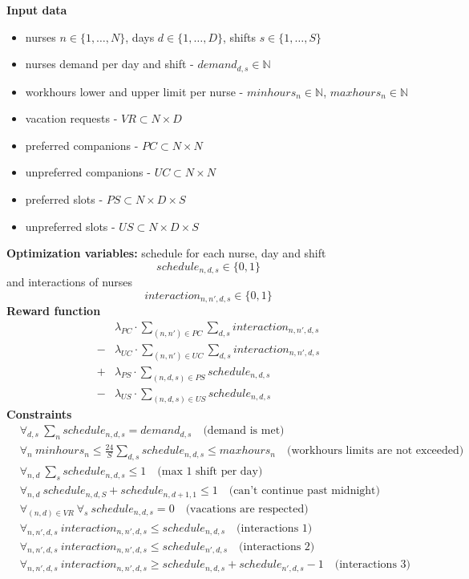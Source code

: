 \documentclass{article}
\newcommand{\N}{\mathbb{N}}
\begin{document}
\noindent \textbf{Input data}
\begin{itemize}
    \item nurses $n\in \{1, \dots, N\}$, days $d\in \{1, \dots, D\}$, shifts $s\in \{1, \dots, S\}$
    \item nurses demand per day and shift - $demand_{d,s} \in \N$
    \item workhours lower and upper limit per nurse - $minhours_n \in \N$, $maxhours_n \in \N$
    \item vacation requests - $VR \subset N \times D$
    \item preferred companions - $PC \subset N \times N$
    \item unpreferred companions - $UC \subset N \times N$
    \item preferred slots - $PS \subset N \times D \times S$
    \item unpreferred slots - $US \subset N \times D \times S$
\end{itemize}
\textbf{Optimization variables:} schedule for each nurse, day and shift 
$$schedule_{n,d,s} \in \{0,1\}$$
and interactions of nurses 
$$interaction_{n,n',d,s} \in \{0,1\}$$
\textbf{Reward function}
\begin{align*}
     &\lambda_{PC}\cdot\sum_{(n, n')\in PC}\sum_{d,s} interaction_{n,n',d,s} \\
    -&\lambda_{UC}\cdot\sum_{(n, n')\in UC}\sum_{d,s} interaction_{n,n',d,s} \\ 
    +&\lambda_{PS}\cdot\sum_{(n, d, s)\in PS} schedule_{n,d,s} \\ 
    -&\lambda_{US}\cdot\sum_{(n, d, s)\in US} schedule_{n,d,s}
\end{align*}
\textbf{Constraints}
\begin{align*}
&\forall_{d,s}\ \sum_n schedule_{n,d,s} = demand_{d, s}\quad \text{(demand is met)} \\
&\forall_{n}\ minhours_n \leq \frac{24}S \sum_{d, s} schedule_{n,d,s} \leq maxhours_n \quad \text{(workhours limits are not exceeded)} \\
&\forall_{n,d}\ \sum_s schedule_{n,d,s} \leq 1\quad \text{(max 1 shift per day)} \\
&\forall_{n,d}\ schedule_{n,d,S}+schedule_{n,d+1,1} \leq 1\quad \text{(can't continue past midnight)} \\
&\forall_{(n,d)\in VR}\ \forall_s\ schedule_{n,d,s} = 0\quad \text{(vacations are respected)} \\
&\forall_{n,n',d,s}\ interaction_{n,n',d,s} \leq schedule_{n,d,s}\quad \text{(interactions 1)} \\
&\forall_{n,n',d,s}\ interaction_{n,n',d,s} \leq schedule_{n',d,s}\quad \text{(interactions 2)} \\
&\forall_{n,n',d,s}\ interaction_{n,n',d,s} \geq schedule_{n,d,s}+schedule_{n',d,s}-1\quad \text{(interactions 3)} \\
\end{align*}
\end{document}
